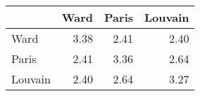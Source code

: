\begin{tabular}{lrrr}
\toprule
{} &  Ward &  Paris &  Louvain \\
\midrule
Ward    &  3.38 &   2.41 &     2.40 \\
Paris   &  2.41 &   3.36 &     2.64 \\
Louvain &  2.40 &   2.64 &     3.27 \\
\bottomrule
\end{tabular}

